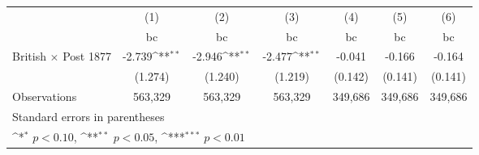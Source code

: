 {
\def\sym#1{\ifmmode^{#1}\else\(^{#1}\)\fi}
\begin{tabular}{l*{6}{c}}
\hline\hline
                    &\multicolumn{1}{c}{(1)}&\multicolumn{1}{c}{(2)}&\multicolumn{1}{c}{(3)}&\multicolumn{1}{c}{(4)}&\multicolumn{1}{c}{(5)}&\multicolumn{1}{c}{(6)}\\
                    &\multicolumn{1}{c}{bc}&\multicolumn{1}{c}{bc}&\multicolumn{1}{c}{bc}&\multicolumn{1}{c}{bc}&\multicolumn{1}{c}{bc}&\multicolumn{1}{c}{bc}\\
\hline
British $\times$ Post 1877&      -2.739\sym{**} &      -2.946\sym{**} &      -2.477\sym{**} &      -0.041         &      -0.166         &      -0.164         \\
                    &     (1.274)         &     (1.240)         &     (1.219)         &     (0.142)         &     (0.141)         &     (0.141)         \\
\hline
Observations        &     563,329         &     563,329         &     563,329         &     349,686         &     349,686         &     349,686         \\
\hline\hline
\multicolumn{7}{l}{\footnotesize Standard errors in parentheses}\\
\multicolumn{7}{l}{\footnotesize \sym{*} \(p<0.10\), \sym{**} \(p<0.05\), \sym{***} \(p<0.01\)}\\
\end{tabular}
}
